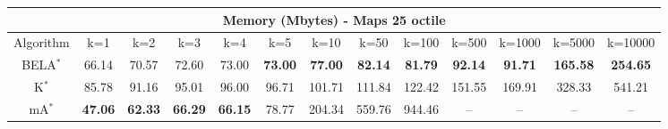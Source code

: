 \begin{tabular}{c|cccccccccccc}\toprule
\multicolumn{13}{c}{Memory (Mbytes) - Maps 25 octile}\\ \midrule
Algorithm & k=1 & k=2 & k=3 & k=4 & k=5 & k=10 & k=50 & k=100 & k=500 & k=1000 & k=5000 & k=10000 \\ \midrule
BELA$^*$ & 66.14 & 70.57 & 72.60 & 73.00 & \textbf{73.00} & \textbf{77.00} & \textbf{82.14} & \textbf{81.79} & \textbf{92.14} & \textbf{91.71} & \textbf{165.58} & \textbf{254.65} \\
K$^*$ & 85.78 & 91.16 & 95.01 & 96.00 & 96.71 & 101.71 & 111.84 & 122.42 & 151.55 & 169.91 & 328.33 & 541.21 \\
mA$^*$ & \textbf{47.06} & \textbf{62.33} & \textbf{66.29} & \textbf{66.15} & 78.77 & 204.34 & 559.76 & 944.46 & -- & -- & -- & -- \\ \bottomrule 
\end{tabular}

